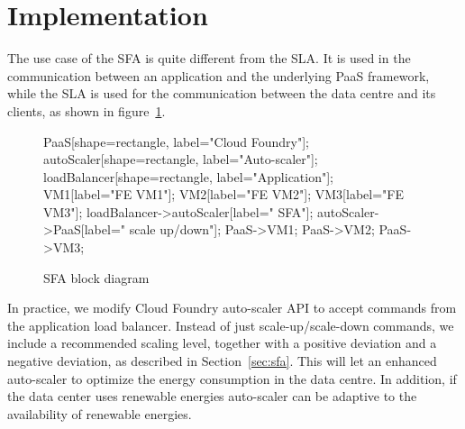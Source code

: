 \section{Implementation}
\label{sec:implem}

The use case of the SFA is quite different from the SLA. 
It is used in the communication between an application and the underlying PaaS framework, while the SLA is used for the communication between the data centre and its clients, as shown in figure~\ref{fig:SFABlock}.

\begin{figure}[h]
\label{fig:SFABlock}
\centering
{}
{
   PaaS[shape=rectangle, label="Cloud Foundry"];
   autoScaler[shape=rectangle, label="Auto-scaler"];
   loadBalancer[shape=rectangle, label="Application"];
   VM1[label="FE VM1"];
   VM2[label="FE VM2"];
   VM3[label="FE VM3"];
   loadBalancer->autoScaler[label=" SFA"];
   autoScaler->PaaS[label=" scale up/down"];
   PaaS->VM1;
   PaaS->VM2;
   PaaS->VM3;
}
\caption{SFA block diagram}
\end{figure}

In practice, we modify Cloud Foundry auto-scaler API to accept commands from the application load balancer.
Instead of just scale-up/scale-down commands, we include a recommended scaling level, together with a positive deviation and a negative deviation, as described in Section~\ref{sec:sfa}.
This will let an enhanced auto-scaler to optimize the energy consumption in the data centre. In addition, if the data center uses renewable energies auto-scaler can be adaptive to the availability of renewable energies.